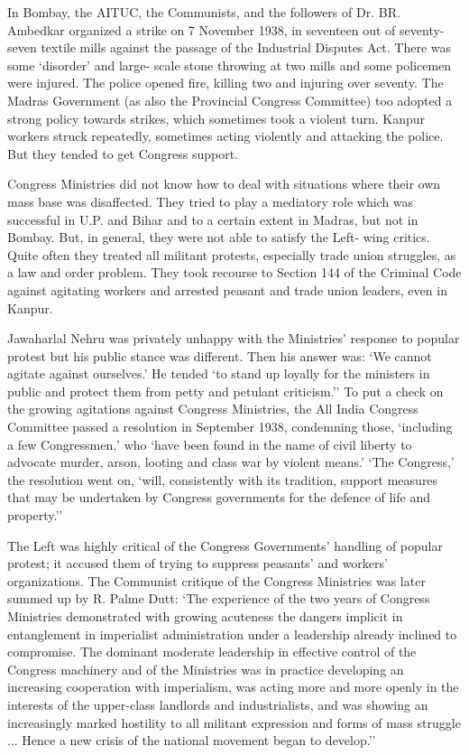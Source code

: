 In Bombay, the AITUC, the Communists, and the followers of Dr. BR. Ambedkar organized a strike on 7 November 1938, in seventeen out of seventy-seven textile mills against the passage of the Industrial Disputes Act. There was some `disorder' and large- scale stone throwing at two mills and some policemen were injured. The police opened fire, killing two and injuring over seventy. The Madras Government (as also the Provincial Congress Committee) too adopted a strong policy towards strikes, which sometimes took a violent turn. Kanpur workers struck repeatedly, sometimes acting violently and attacking the police. But they tended to get Congress support. 

Congress Ministries did not know how to deal with situations where their own mass base was disaffected. They tried to play a mediatory role which was successful in U.P. and Bihar and to a certain extent in Madras, but not in Bombay. But, in general, they were not able to satisfy the Left- wing critics. Quite often they treated all militant protests, especially trade union struggles, as a law and order problem. They took recourse to Section 144 of the Criminal Code against agitating workers and arrested peasant and trade union leaders, even in Kanpur. 

Jawaharlal Nehru was privately unhappy with the Ministries' response to popular protest but his public stance was different. Then his answer was: `We cannot agitate against ourselves.' He tended `to stand up loyally for the ministers in public and protect them from petty and petulant criticism.'' To put a check on the growing agitations against Congress Ministries, the All India Congress Committee passed a resolution in September 1938, condemning those, `including a few Congressmen,' who `have been found in the name of civil liberty to advocate murder, arson, looting and class war by violent means.' `The Congress,' the resolution went on, `will, consistently with its tradition, support measures that may be undertaken by Congress governments for the defence of life and property.'' 

The Left was highly critical of the Congress Governments' handling of popular protest; it accused them of trying to suppress peasants' and workers' organizations. The Communist critique of the Congress Ministries was later summed up by R. Palme Dutt: `The experience of the two years of Congress Ministries demonstrated with growing acuteness the dangers implicit in entanglement in imperialist administration under a leadership already inclined to compromise. The dominant moderate leadership in effective control of the Congress machinery and of the Ministries was in practice developing an increasing cooperation with imperialism, was acting more and more openly in the interests of the upper-class landlords and industrialists, and was showing an increasingly marked hostility to all militant expression and forms of mass struggle ... Hence a new crisis of the national movement began to develop.'' 

